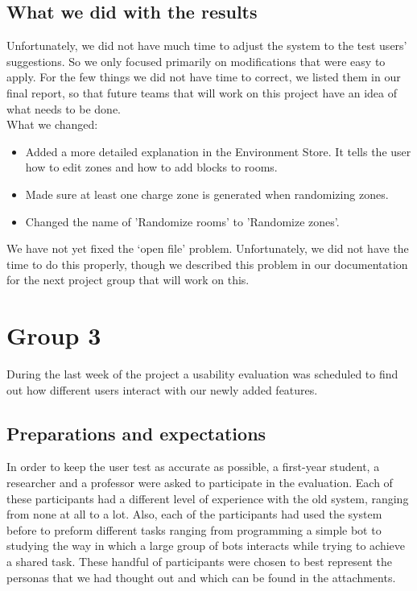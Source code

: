 \subsection*{What we did with the results}
Unfortunately, we did not have much time to adjust the system to the test users' suggestions. So we only focused primarily on modifications that were easy to apply. For the few things we did not have time to correct, we listed them in our final report, so that future teams that will work on this project have an idea of what needs to be done. \\

What we changed:
\begin{itemize}
\item Added a more detailed explanation in the Environment Store. It tells the user how to edit zones and how to add blocks to rooms.
\item Made sure at least one charge zone is generated when randomizing zones. 
\item Changed the name of 'Randomize rooms' to 'Randomize zones'.
\end{itemize}

We have not yet fixed the `open file' problem. Unfortunately, we did not have the time to do this properly, though we described this problem in our documentation for the next project group that will work on this.

\section{Group 3}
During the last week of the project a usability evaluation was scheduled to find out how different users interact with our newly added features.

\subsection*{Preparations and expectations }
In order to keep the user test as accurate as possible, a first-year student, a researcher and a professor were asked to participate in the evaluation. Each of these participants had a different level of experience with the old system, ranging from none at all to a lot. Also, each of the participants had used the system before to preform different tasks ranging from programming a simple bot to studying the way in which a large group of bots interacts while trying to achieve a shared task. These handful of participants were chosen to best represent the personas that we had thought out and which can be found in the attachments. \\

